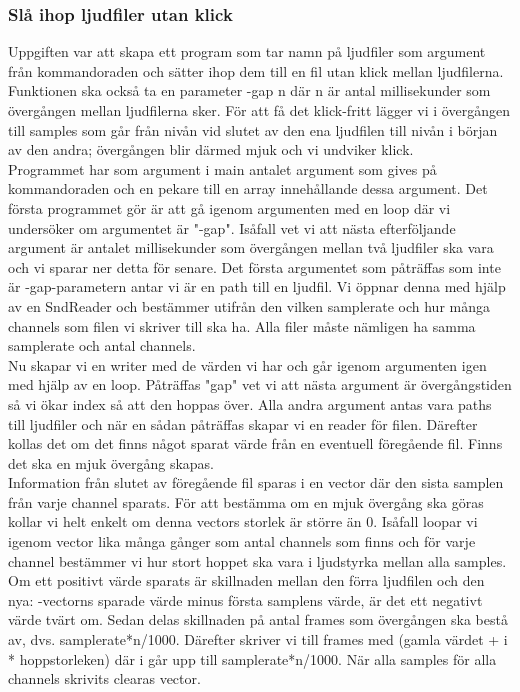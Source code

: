 \documentclass[a4paper, 11pt]{article}
\begin{document}
\subsubsection{Slå ihop ljudfiler utan klick}

Uppgiften var att skapa ett program som tar namn på ljudfiler som argument från kommandoraden och sätter ihop dem till en fil utan klick mellan ljudfilerna. Funktionen ska också ta en parameter -gap n där n är antal millisekunder som övergången mellan ljudfilerna sker. För att få det klick-fritt lägger vi i övergången till samples som går från nivån vid slutet av den ena ljudfilen till nivån i början av den andra; övergången blir därmed mjuk och vi undviker klick.
\\[\baselineskip]
Programmet har som argument i main antalet argument som gives på kommandoraden och en pekare till en array innehållande dessa argument. Det första programmet gör är att gå igenom argumenten med en loop där vi undersöker om argumentet är "-gap". Isåfall vet vi att nästa efterföljande argument är antalet millisekunder som övergången mellan två ljudfiler ska vara och vi sparar ner detta för senare. Det första argumentet som påträffas som inte är -gap-parametern antar vi är en path till en ljudfil. Vi öppnar denna med hjälp av en SndReader och bestämmer utifrån den vilken samplerate och hur många channels som filen vi skriver till ska ha. Alla filer måste nämligen ha samma samplerate och antal channels.
\\[\baselineskip]
Nu skapar vi en writer med de värden vi har och går igenom argumenten igen med hjälp av en loop. Påträffas "\-gap" vet vi att nästa argument är övergångstiden så vi ökar index så att den hoppas över. Alla andra argument antas vara paths till ljudfiler och när en sådan påträffas skapar vi en reader för filen. Därefter kollas det om det finns något sparat värde från en eventuell föregående fil. Finns det ska en mjuk övergång skapas.
\\[\baselineskip]
Information från slutet av föregående fil sparas i en vector där den sista samplen från varje channel sparats. För att bestämma om en mjuk övergång ska göras kollar vi helt enkelt om denna vectors storlek är större än 0. Isåfall loopar vi igenom vector lika många gånger som antal channels som finns och för varje channel bestämmer vi hur stort hoppet ska vara i ljudstyrka mellan alla samples. Om ett positivt värde sparats är skillnaden mellan den förra ljudfilen och den nya: -vectorns sparade värde minus första samplens värde, är det ett negativt värde tvärt om. Sedan delas skillnaden på antal frames som övergången ska bestå av, dvs. samplerate*n/1000. Därefter skriver vi till frames med (gamla värdet + i * hoppstorleken) där i går upp till samplerate*n/1000. När alla samples för alla channels skrivits clearas vector.
\end{document}

